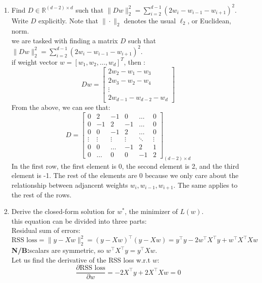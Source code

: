 \documentclass[a3paper,12pt]{extarticle} %
\begin{document}
\begin{enumerate}
    \begin{enumerate}
        \item Find \( D \in \mathbb{R}^{(d-2) \times d} \) such that \(\|Dw\|_2^2 = \sum_{i=2}^{d-1} (2w_i - w_{i-1} - w_{i+1})^2\). Write \( D \) explicitly. Note that \(\|\cdot\|_2\) denotes the usual \(\ell_2\), or Euclidean, norm.
        \\ we are tasked with finding a matrix \(D\) such that \(\|Dw\|_2^2 = \sum_{i=2}^{d-1} (2w_i - w_{i-1} - w_{i+1})^2\). 
        \\ if weight vector \(w = [w_1, w_2, \ldots, w_d]^T\), then :
        \[
        Dw = \begin{bmatrix}
        2w_2 - w_1 - w_3 \\
        2w_3 - w_2 - w_4 \\
        \vdots \\
        2w_{d-1} - w_{d-2} - w_d
        \end{bmatrix}
        \]
        From the above, we can see that:
        \[
        D = \begin{bmatrix}
        0 & 2 & -1 & 0 & \ldots & 0 \\
        0 & -1 & 2 & -1 & \ldots & 0 \\
        0 & 0 & -1 & 2 & \ldots & 0 \\
        \vdots & \vdots & \vdots & \vdots & \ddots & \vdots \\
        0 & 0 & \ldots & -1 &2 & 1\\
        0 & \ldots & 0 & 0 & -1 & 2
        \end{bmatrix}_{(d-2) \times d}
        \]
        In the first row, the first element is 0, the second element is 2, and the third element is -1. The rest of the elements are 0 because we only care about the relationship between adjancent weights \(w_i, w_{i-1}, w_{i+1}\). The same applies to the rest of the rows.
        \item Derive the closed-form solution for \( w^* \), the minimizer of \( L(w) \).
        \\ this equation can be divided into three parts:
        \\ Residual sum of errors:
        \[
        \text{RSS loss} = \|y - Xw\|_2^2 = (y - Xw)^\top (y - Xw) = y^\top y - 2w^\top X^\top y + w^\top X^\top Xw
        \]
        \textbf{N/B:}scalars are symmetric, so \(w^\top X^\top y = y^\top Xw\).
        \\ Let us find the derivative of the RSS loss w.r.t \(w\):
        \[
        \frac{\partial \text{RSS loss}}{\partial w} = -2X^\top y + 2X^\top Xw = 0
\]
\end{enumerate}
\end{enumerate}
\end{document}
